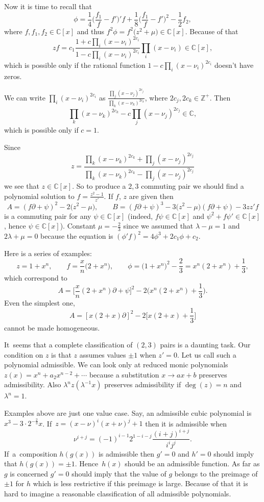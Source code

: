 \documentclass[pdftex]{sigma}
\numberwithin{equation}{section}
\newcommand{\de}{\partial}
\newcommand{\Z}{\mathbb Z}
\newcommand{\C}{\mathbb C}
\newcommand{\la}{\lambda}
\begin{document}
Now it is time to recall that
\[
\phi = \frac{1}{4}\bigg(\frac{f_1}{f} - f'\bigg)'f + \frac{1}{8}\bigg(\frac{f_1}{f} - f'\bigg)^2 - \frac{1}{2}f_2,
\]
where $f, f_1, f_2 \in \C[x]$ and thus $f^2\phi = f^2\big(z^2 + \mu\big) \in \C[x]$.
Because of that{\samepage
\[
zf = c_1\frac{1 + c \prod_i(x - \nu_i)^{2c_i}}{1 - c \prod_i(x - \nu_i)^{2c_i}}\prod_i (x - \nu_i) \in \C[x],
\]
which is possible only if the rational function $1 - c \prod_i(x - \nu_i)^{2c_i}$ doesn't have zeros.}

We can write $\prod_i(x - \nu_i)^{2c_i}$ as $\frac{\prod_j(x - \nu_j)^{2c_j}}{\prod_k(x - \nu_k)^{2c_k}}$, where $2c_j, 2c_k \in \Z^+$.
Then
\[
\prod_k(x - \nu_k)^{2c_k} - c\prod_j(x - \nu_j)^{2c_j} \in \C,
\]
which is possible only if $c = 1$.

Since
\[
z = \frac{\prod_k(x - \nu_k)^{2c_k} + \prod_j(x - \nu_j)^{2c_j}}{\prod_k(x - \nu_k)^{2c_k} - \prod_j(x - \nu_j)^{2c_j}}
\]
we see that $z \in \C[x]$. So to produce a $2,3$ commuting pair we should find a polynomial solution to $f = \frac{z^2 - 1}{z'}$.
If $f$, $z$ are given then
\[
A = (f\de + \psi)^2 - 2\big(z^2 - \mu\big), \qquad
B = (f\de + \psi)^3 - 3\big(z^2 - \mu\big)(f\de + \psi) - 3zz'f
\]
is a commuting pair for any $\psi \in \C[x]$ (indeed, $f\psi \in \C[x]$ and $\psi^2 + f\psi' \in \C[x]$, hence $\psi \in \C[x]$).
Constant $\mu = -\frac{2}{3}$ since we assumed that $\la - \mu = 1$ and $2\la + \mu = 0$ because the equation is $(\phi'f)^2 = 4\phi^3 + 2c_1\phi + c_2$.

Here is a series of examples:
\[
z = 1 + x^n,\qquad
f = \frac{x}{n}\big(2 + x^n\big),\qquad
\phi = \big(1 + x^n\big)^2 - \frac{2}{3} = x^n(2 + x^n) +\frac{1}{3},
\]
which correspond to
\[
A = \bigg[\frac{x}{n}(2 + x^n)\de + \psi\bigg]^2 - 2\bigg(x^n(2 + x^n) + \frac{1}{3}\bigg).
\]
Even the simplest one,
\[
A = [x(2 + x)\de]^2 - 2\bigg[x(2 + x) + \frac{1}{3}\bigg]
\]
cannot be made homogeneous.

It~seems that a complete classification of $(2,3)$ pairs is a daunting task. Our condition on $z$ is that $z$ assumes values $\pm 1$ when $z' = 0$. Let us call such a polynomial admissible. We can look only at reduced monic polynomials $z(x) = x^n + a_2x^{n-2} + \cdots$ because a substitution $x \rightarrow ax + b$ preserves admissibility. Also $\la^nz(\la^{-1}x)$ preserves admissibility if $\deg(z) = n$ and $\la^n = 1$.

Examples above are just one value case. Say, an admissible cubic polynomial is $x^3 - 3\cdot2^{-\frac{2}{3}}x$. If~$z = (x-\nu)^i(x+\nu)^j +1$ then it is admissible when
\[
\nu^{i+j} = (-1)^{i-1}2^{1 -i-j}\frac{(i+j)^{i+j}}{i^ij^j}.
\]
If~a~com\-position $h(g(x))$ is admissible then $g' = 0$ and $h' = 0$ should imply that $h(g(x)) = \pm1$. Hence~$h(x)$ should be an admissible function. As far as $g$ is concerned $g' = 0$ should imply that the value of $g$ belongs to the preimage of $\pm 1$ for $h$ which is less restrictive if this preimage is large.
Because of that it is hard to imagine a reasonable classification of all admissible polynomials.
\end{document}
